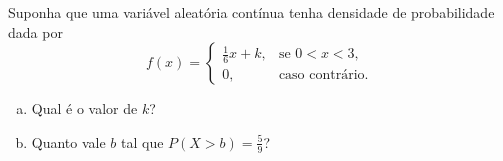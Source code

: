%
%


\begin{exercicioBanco}[\valorquestao]
Suponha que uma variável aleatória contínua tenha densidade de probabilidade dada por
%
\[
    f(x) = \left\{
    \begin{array}{rl}
        \frac{1}{6}x + k, & \text{se } 0 < x < 3, \\
        0, & \text{caso contrário}.
    \end{array}
    \right.
\]
%
\begin{enumerate}[(a)]
    \item Qual é o valor de \(k\)?
    \item Quanto vale \(b\) tal que \(P(X > b) = \frac{5}{9}\)?
\end{enumerate}
%
\end{exercicioBanco}

